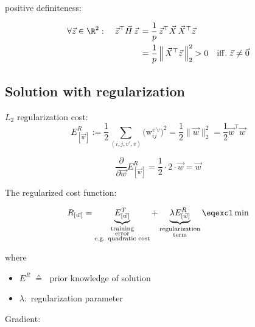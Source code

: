 \begin{frame}
positive definiteness:

\begin{align}
\forall \vec z \in \R^2: \quad \vec z^\top \vec H\, \vec z 
\, &= \frac{1}{p} \, \vec z^\top \vec X \, \vec X^\top \vec z\\
\, &= \frac{1}{p} \, \Big \lVert \, \vec X^\top \vec z \, \Big \rVert_2^2 > 0 \quad \mathrm{iff.} \; \vec z \ne \vec 0
\end{align}

\end{frame}

\subsection{Solution with regularization}

\begin{frame}

$L_2$ regularization cost:
\begin{equation}
E^R_{[\vec w]} := \frac{1}{2} \sum_{(i, j, v', v)} 
			\big( \mathrm{w}_{ij}^{v'v} \big)^2 = \frac{1}{2} \lVert \vec w \rVert_2^2 = \frac{1}{2} \vec w^\top \vec w 
\end{equation}

\begin{equation}
\frac{\partial}{\partial \vec w} E^R_{[\vec w]} = \frac{1}{2} \cdot 2 \cdot \vec w = \vec w
\end{equation}

The regularized cost function:

\begin{equation}
	R_{[\vec{w}]} = \underbrace{ E_{[\vec{w}]}^T }_{
			\substack{\text{training} \\ \text{error} \\ \text{e.g. quadratic cost}}}
		+ \underbrace{ \lambda E_{[\vec{w}]}^R }_{
			\substack{\text{regularization} \\ \text{term}}}
		\eqexcl \min 
\end{equation}

where 
\begin{itemize}
	\item $E^R \; \corresponds \; $ prior knowledge of solution
	\item $\lambda:$ regularization parameter 
\end{itemize}

Gradient:


\end{frame}
